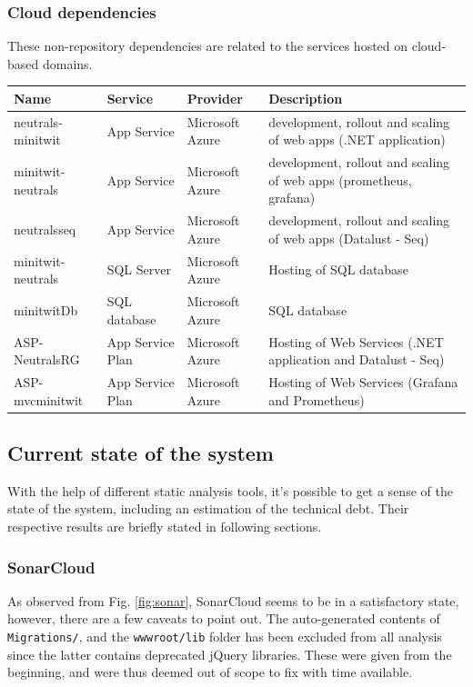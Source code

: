 \documentclass{article}
\begin{document}
\subsubsection{Cloud dependencies}
These non-repository dependencies are related to the services hosted on cloud-based domains.

\begin{table}[H]
\begin{tabularx}{\textwidth}{|l|l|l|X|}
\hline
    \textbf{Name} & \textbf{Service} & \textbf{Provider} & \textbf{Description} \\ \hline
    neutrals-minitwit & App Service & Microsoft Azure & development, rollout and scaling of web apps (.NET application) \\ \hline
    minitwit-neutrals & App Service & Microsoft Azure &development, rollout and scaling of web apps (prometheus, grafana) \\ \hline
    neutralsseq & App Service & Microsoft Azure & development, rollout and scaling of web apps (Datalust - Seq) \\ \hline
    minitwit-neutrals & SQL Server & Microsoft Azure & Hosting of SQL database \\ \hline
    minitwitDb & SQL database & Microsoft Azure & SQL database \\ \hline
    ASP-NeutralsRG & App Service Plan & Microsoft Azure & Hosting of Web Services (.NET application and Datalust - Seq) \\ \hline
    ASP-mvcminitwit & App Service Plan & Microsoft Azure & Hosting of Web Services (Grafana and Prometheus) \\ \hline
\end{tabularx}
\end{table}

\subsection{Current state of the system} 
With the help of different static analysis tools, it's possible to get a sense of the state of the system, including an estimation of the technical debt. Their respective results are briefly stated in following sections.

\subsubsection*{SonarCloud}
As observed from Fig. \ref{fig:sonar}, SonarCloud seems to be in a satisfactory state, however, there are a few caveats to point out. The auto-generated contents of \texttt{Migrations/}, and the \texttt{wwwroot/lib} folder has been excluded from all analysis since the latter contains deprecated jQuery libraries. These were given from the beginning, and were thus deemed out of scope to fix with time available. 
\end{document}

